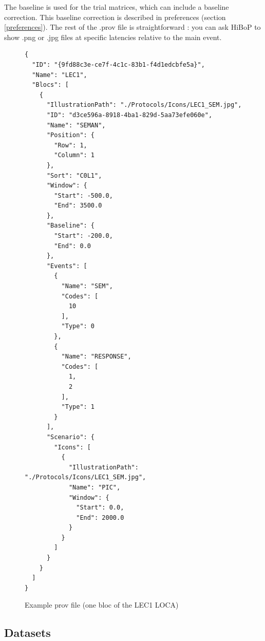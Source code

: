 \documentclass[a4paper]{article}
\begin{document}
The baseline is used for the trial matrices, which can include a baseline correction. This baseline correction is described in preferences (section \ref{preferences}).
The rest of the .prov file is straightforward : you can ask HiBoP to show .png or .jpg files at specific latencies relative to the main event.
\begin{figure}[H]
\begin{lstlisting}
{
  "ID": "{9fd88c3e-ce7f-4c1c-83b1-f4d1edcbfe5a}",
  "Name": "LEC1",
  "Blocs": [
    {
      "IllustrationPath": "./Protocols/Icons/LEC1_SEM.jpg",
      "ID": "d3ce596a-8918-4ba1-829d-5aa73efe060e",
      "Name": "SEMAN",
      "Position": {
        "Row": 1,
        "Column": 1
      },
      "Sort": "C0L1",
      "Window": {
        "Start": -500.0,
        "End": 3500.0
      },
      "Baseline": {
        "Start": -200.0,
        "End": 0.0
      },
      "Events": [
        {
          "Name": "SEM",
          "Codes": [
            10
          ],
          "Type": 0
        },
        {
          "Name": "RESPONSE",
          "Codes": [
            1,
            2
          ],
          "Type": 1
        }
      ],
      "Scenario": {
        "Icons": [
          {
            "IllustrationPath": "./Protocols/Icons/LEC1_SEM.jpg",
            "Name": "PIC",
            "Window": {
              "Start": 0.0,
              "End": 2000.0
            }
          }
        ]
      }
    }
  ]
}
\end{lstlisting}
\caption{\label{provFile}Example prov file (one bloc of the LEC1 LOCA)}
\end{figure}
\subsection{Datasets}
\end{document}
